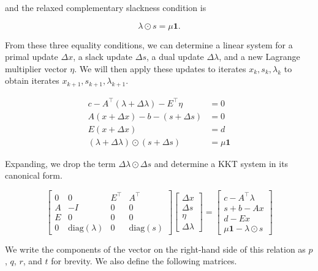 \documentclass[12pt,titlepage]{report}
\begin{document}
	and the relaxed complementary slackness condition is
	
	\begin{equation}
		\lambda \odot s = \mu \mathbf{1}.
	\end{equation}
	
	From these three equality conditions, we can determine a linear system for a primal update \( \Delta x \), a slack update \( \Delta s \), a dual update \( \Delta \lambda \), and a new Lagrange multiplier vector \( \eta \).  We will then apply these updates to iterates \( x_k, s_k, \lambda_k \) to obtain iterates \( x_{k+1}, s_{k+1}, \lambda_{k+1} \).
	
	\begin{align}
		c - A^\top (\lambda + \Delta \lambda) - E^\top \eta &= 0 \\
		A(x + \Delta x) - b - (s + \Delta s) &= 0 \\
		E (x + \Delta x) &= d \\
		(\lambda + \Delta \lambda) \odot \left( s + \Delta s \right) &= \mu \mathbf{1}
	\end{align}
	
	Expanding, we drop the term \( \Delta \lambda \odot \Delta s \) and determine a KKT system in its canonical form.
	
	\begin{equation}
		\begin{bmatrix}
			0 & 0 & E^\top & A^\top \\
			A & -I & 0 & 0 \\
			E & 0 & 0 & 0 \\
			0 & \mathrm{diag}(\lambda) & 0 & \mathrm{diag}(s)
		\end{bmatrix}
		\begin{bmatrix}
			\Delta x \\
			\Delta s \\
			\eta \\
			\Delta \lambda
		\end{bmatrix}
		=
		\begin{bmatrix}
			c - A^\top \lambda \\
			s + b - A x \\
			d - E x \\
			\mu \mathbf{1} - \lambda \odot s
		\end{bmatrix}
	\end{equation}
	
	We write the components of the vector on the right-hand side of this relation as \( p \), \( q \), \( r \), and \( t \) for brevity.  We also define the following matrices.
	
\end{document}
